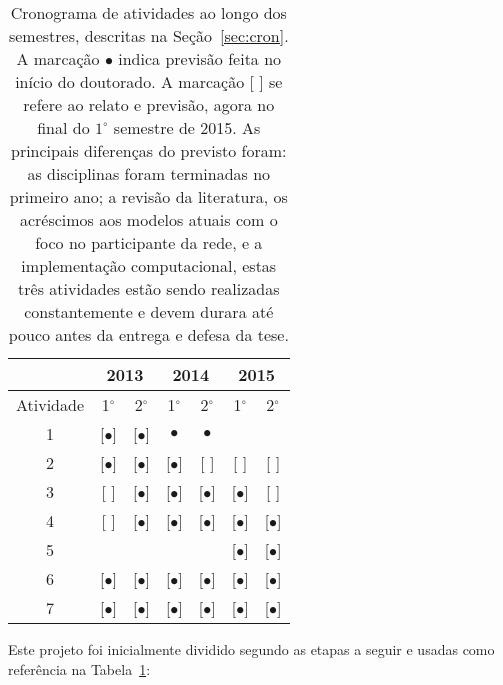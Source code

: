 \documentclass[a4paper,openright,12pt]{report} %
\begin{document}
\begin{table}[h!]
\label{tab:cron}
\begin{center}
  \begin{tabular}{ | c ||   c | c |     c | c |   c | c |}
    \hline
      & \multicolumn{2}{|c|}{2013} & \multicolumn{2}{|c|}{2014} & \multicolumn{2}{|c|}{2015} \\
    \hline
    Atividade & 1$^{\circ}$ & 2$^{\circ}$ & 1$^{\circ}$ & 2$^{\circ}$ & 1$^{\circ}$ & 2$^{\circ}$ \\
    \hline \hline

    1 & [$\bullet$] & [$\bullet$] & $\bullet$ & $\bullet$ & & \\
    \hline
    2 & [$\bullet$] & [$\bullet$] & [$\bullet$] & [ ] & [ ] & [ ] \\
    \hline
    3 & [ ] & [$\bullet$] & [$\bullet$] & [$\bullet$] & [$\bullet$] & [ ]  \\
    \hline
    4 & [ ] & [$\bullet$] & [$\bullet$] & [$\bullet$] & [$\bullet$] & [$\bullet$]  \\
    \hline
    5 & & & & & [$\bullet$] & [$\bullet$]  \\
    \hline
    6 & [$\bullet$] & [$\bullet$] & [$\bullet$] & [$\bullet$] & [$\bullet$] & [$\bullet$]  \\
    \hline
    7 & [$\bullet$] & [$\bullet$] & [$\bullet$] & [$\bullet$] & [$\bullet$] & [$\bullet$]  \\
    \hline
  \end{tabular}
  \caption{Cronograma de atividades ao longo dos semestres, descritas na Seção~\ref{sec:cron}.
	  A marcação $\bullet$ indica previsão feita no início do doutorado.
  A marcação [ ] se refere ao relato e previsão, agora no final do $1^{\circ}$ semestre de 2015.
  As principais diferenças do previsto foram: as disciplinas foram terminadas no primeiro ano; a revisão da literatura, os acréscimos aos modelos atuais com o foco no participante da rede, e a implementação computacional, estas três atividades estão sendo realizadas constantemente e devem durara até pouco antes da entrega e defesa da tese. }
\label{tab:cron}
\end{center}
\end{table}


Este projeto foi inicialmente dividido segundo as etapas a seguir 
e usadas como referência na Tabela~\ref{tab:cron}:
\end{document}
